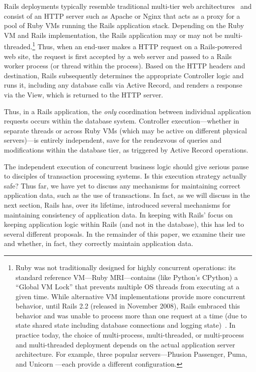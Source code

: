 Rails deployments typically resemble traditional multi-tier web architectures~\cite{alonso-web} and consist of an HTTP server such as Apache or Nginx that acts as a proxy for a pool of Ruby VMs running the Rails application stack. Depending on the Ruby VM and Rails implementation, the Rails application may or may not be multi-threaded.\footnote{Ruby was not traditionally designed for highly concurrent operations: its standard reference VM---Ruby MRI---contains (like Python's CPython) a ``Global VM Lock'' that prevents multiple OS threads from executing at a given time. While alternative VM implementations provide more concurrent behavior, until Rails 2.2 (released in November 2008), Rails embraced this behavior and was unable to process more than one request at a time (due to state shared state including database connections and logging state)~\cite{rails-threading}. In practice today, the choice of multi-process, multi-threaded, or multi-process and multi-threaded deployment depends on the actual application server architecture. For example, three popular servers---Phusion Passenger, Puma, and Unicorn ---each provide a different configuration.} Thus, when an end-user makes a HTTP request on a Rails-powered web site, the request is first accepted by a web server and passed to a Rails worker process (or thread within the process). Based on the HTTP headers and destination, Rails subsequently determines the appropriate Controller logic and runs it, including any database calls via Active Record, and renders a response via the View, which is returned to the HTTP server.

Thus, in a Rails application, the \textit{only} coordination between individual application requests occurs within the database system. Controller execution---whether in separate threads or across Ruby VMs (which may be active on different physical servers)---is entirely independent, save for the rendezvous of queries and modifications within the database tier, as triggered by Active Record operations.

The independent execution of concurrent business logic should give serious pause to disciples of transaction processing systems. Is this execution strategy actually safe? Thus far, we have yet to discuss any mechanisms for maintaining correct application data, such as the use of transactions. In fact, as we will discuss in the next section, Rails has, over its lifetime, introduced several mechanisms for maintaining consistency of application data. In keeping with Rails' focus on keeping application logic within Rails (and not in the database), this has led to several different proposals. In the remainder of this paper, we examine their use and whether, in fact, they correctly maintain application data.



